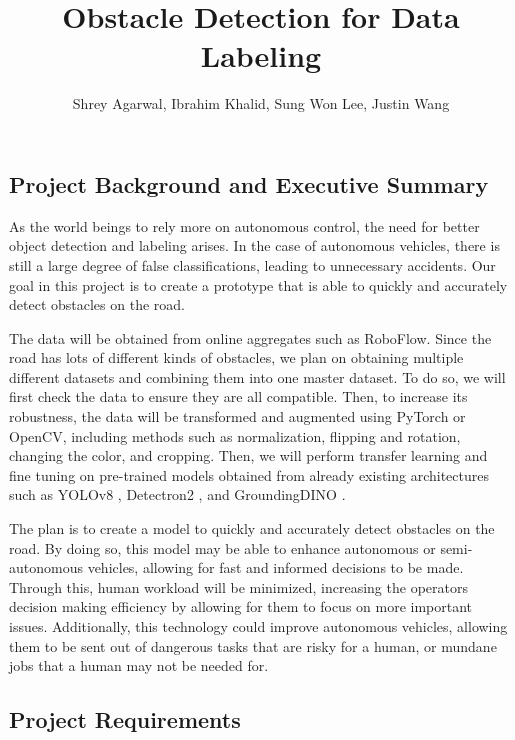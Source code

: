 \documentclass[stu,12pt,floatsintext]{apa7}
\title{Obstacle Detection for Data Labeling}
\author{Shrey Agarwal, Ibrahim Khalid, Sung Won Lee, Justin Wang}
\begin{document}
\maketitle

\subsection{Project Background and Executive Summary}
As the world beings to rely more on autonomous control, the need for better object detection and labeling arises. In the case of autonomous vehicles, there is still a large degree of false classifications, leading to unnecessary accidents. Our goal in this project is to create a prototype that is able to quickly and accurately detect obstacles on the road.

The data will be obtained from online aggregates such as RoboFlow. Since the road has lots of different kinds of obstacles, we plan on obtaining multiple different datasets and combining them into one master dataset. To do so, we will first check the data to ensure they are all compatible. Then, to increase its robustness, the data will be transformed and augmented using PyTorch or OpenCV, including methods such as normalization, flipping and rotation, changing the color, and cropping. Then, we will perform transfer learning and fine tuning on pre-trained models obtained from already existing architectures such as YOLOv8 \parencite{varghese_yolov8_2024}, Detectron2 \parencite{wu2019detectron2}, and GroundingDINO \parencite{liu_grounding_2024}.

The plan is to create a model to quickly and accurately detect obstacles on the road. By doing so, this model may be able to enhance autonomous or semi-autonomous vehicles, allowing for fast and informed decisions to be made. Through this, human workload will be minimized, increasing the operators decision making efficiency by allowing for them to focus on more important issues. Additionally, this technology could improve autonomous vehicles, allowing them to be sent out of dangerous tasks that are risky for a human, or mundane jobs that a human may not be needed for.

\subsection{Project Requirements}
\end{document}
